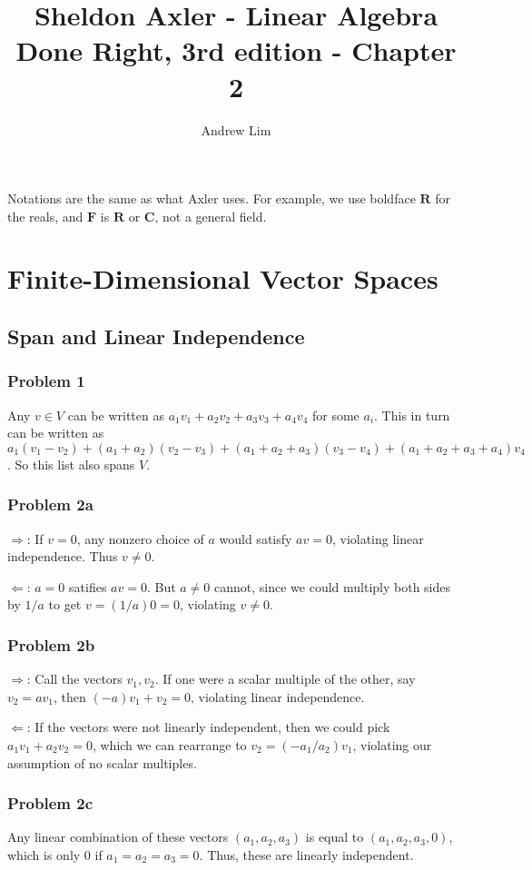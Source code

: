 \documentclass{article}
\begin{document}
\title{Sheldon Axler - Linear Algebra Done Right, 3rd edition - Chapter 2}
\author{Andrew Lim}

\def \problem#1{\subsubsection*{Problem #1}}
\def \real{\mathbf{R}}
\def \complex{\mathbf{C}}
\def \field{\mathbf{F}}

Notations are the same as what Axler uses. For example, we use boldface $\real$
for the reals, and $\field$ is $\real$ or $\complex$, not a general field.

\section{Finite-Dimensional Vector Spaces}

\subsection{Span and Linear Independence}

\problem{1}

Any $v \in V$ can be written as $a_1v_1 + a_2v_2 + a_3v_3 + a_4v_4$ for some
$a_i$. This in turn can be written as $a_1(v_1 - v_2) + (a_1 + a_2)(v_2 - v_3) +
(a_1 + a_2 + a_3)(v_3 - v_4) + (a_1 + a_2 + a_3 + a_4)v_4$. So this list also
spans $V$.

\problem{2a}

$\Rightarrow$: If $v = 0$, any nonzero choice of $a$ would satisfy $av = 0$,
violating linear independence. Thus $v \neq 0$.

$\Leftarrow$: $a = 0$ satifies $av = 0$. But $a \neq 0$ cannot, since we could
multiply both sides by $1/a$ to get $v = (1/a)0 = 0$, violating $v \neq 0$.

\problem{2b}

$\Rightarrow$: Call the vectors $v_1, v_2$. If one were a scalar multiple of the
other, say $v_2 = av_1$, then $(-a)v_1 + v_2 = 0$, violating linear
independence.

$\Leftarrow$: If the vectors were not linearly independent, then we could pick
$a_1v_1 + a_2v_2 = 0$, which we can rearrange to $v_2 = (-a_1/a_2)v_1$,
violating our assumption of no scalar multiples.

\problem{2c}

Any linear combination of these vectors $(a_1, a_2, a_3)$ is equal to $(a_1,
a_2, a_3, 0)$, which is only 0 if $a_1 = a_2 = a_3 = 0$. Thus, these are
linearly independent.
\end{document}
